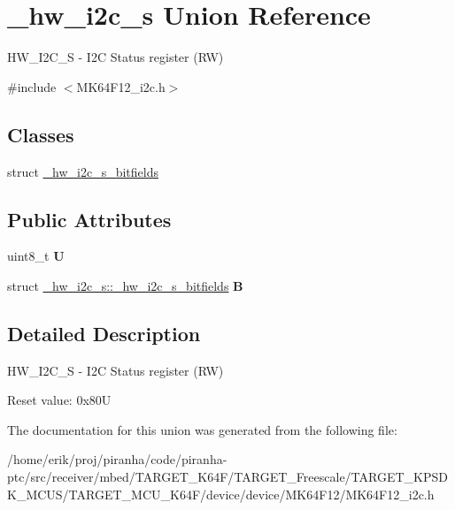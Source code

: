 \hypertarget{union__hw__i2c__s}{}\section{\+\_\+hw\+\_\+i2c\+\_\+s Union Reference}
\label{union__hw__i2c__s}


H\+W\+\_\+\+I2\+C\+\_\+S -\/ I2C Status register (RW)  




{\ttfamily \#include $<$M\+K64\+F12\+\_\+i2c.\+h$>$}

\subsection*{Classes}
\begin{DoxyCompactItemize}
\item 
struct \hyperlink{struct__hw__i2c__s_1_1__hw__i2c__s__bitfields}{\+\_\+hw\+\_\+i2c\+\_\+s\+\_\+bitfields}
\end{DoxyCompactItemize}
\subsection*{Public Attributes}
\begin{DoxyCompactItemize}
\item 
uint8\+\_\+t {\bfseries U}\hypertarget{union__hw__i2c__s_a07a154adafedc0949ea6f961dabd509c}{}\label{union__hw__i2c__s_a07a154adafedc0949ea6f961dabd509c}

\item 
struct \hyperlink{struct__hw__i2c__s_1_1__hw__i2c__s__bitfields}{\+\_\+hw\+\_\+i2c\+\_\+s\+::\+\_\+hw\+\_\+i2c\+\_\+s\+\_\+bitfields} {\bfseries B}\hypertarget{union__hw__i2c__s_ae327b1d600d874d97487ea0b41b5fe32}{}\label{union__hw__i2c__s_ae327b1d600d874d97487ea0b41b5fe32}

\end{DoxyCompactItemize}


\subsection{Detailed Description}
H\+W\+\_\+\+I2\+C\+\_\+S -\/ I2C Status register (RW) 

Reset value\+: 0x80U 

The documentation for this union was generated from the following file\+:\begin{DoxyCompactItemize}
\item 
/home/erik/proj/piranha/code/piranha-\/ptc/src/receiver/mbed/\+T\+A\+R\+G\+E\+T\+\_\+\+K64\+F/\+T\+A\+R\+G\+E\+T\+\_\+\+Freescale/\+T\+A\+R\+G\+E\+T\+\_\+\+K\+P\+S\+D\+K\+\_\+\+M\+C\+U\+S/\+T\+A\+R\+G\+E\+T\+\_\+\+M\+C\+U\+\_\+\+K64\+F/device/device/\+M\+K64\+F12/M\+K64\+F12\+\_\+i2c.\+h\end{DoxyCompactItemize}
